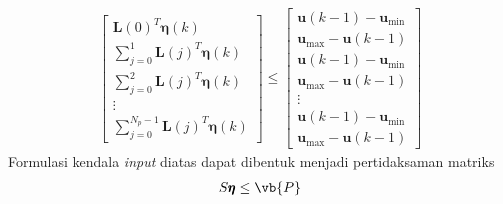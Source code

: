 \begin{enumerate}
\begin{align*}
\begin{bmatrix}
            \pmb{L}(0)^T\pmb{\eta}(k) \\
            \sum\limits_{j=0}^{1}\pmb{L}(j)^T\pmb{\eta}(k) \\
            \sum\limits_{j=0}^{2}\pmb{L}(j)^T\pmb{\eta}(k) \\
            \vdots \\
            \sum\limits_{j=0}^{N_p-1}\pmb{L}(j)^T\pmb{\eta}(k)
        \end{bmatrix} \leq \begin{bmatrix}
            \pmb{u}(k-1)-\pmb{u}_{\min} \\ \pmb{u}_{\max}-\pmb{u}(k-1) \\ \pmb{u}(k-1)-\pmb{u}_{\min} \\ \pmb{u}_{\max}-\pmb{u}(k-1) \\ \vdots \\ \pmb{u}(k-1)-\pmb{u}_{\min} \\ \pmb{u}_{\max}-\pmb{u}(k-1)
        \end{bmatrix} 
    \end{align*}
    Formulasi kendala \textit{input} diatas dapat dibentuk menjadi pertidaksaman matriks
    \begin{align*}
        S \pmb{\eta} \leq \vb{P} 
    \end{align*}


\end{enumerate}
